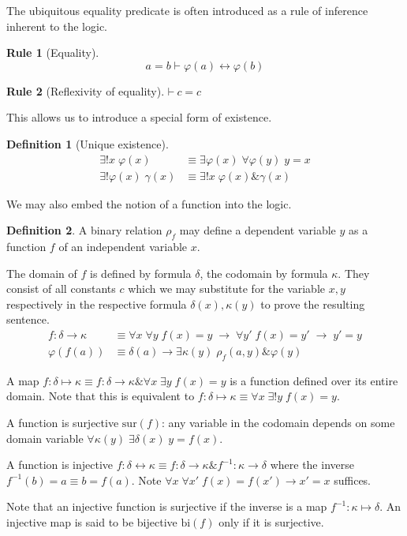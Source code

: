 \documentclass{amsbook}
\newcommand{\infers}{\mathrel\vdash}
\newcommand{\theorem}{\mathord\vdash\medspace}
\newcommand{\univ}[1]{\mathord\forall#1\;}
\newcommand{\exis}[1]{\mathord\exists#1\;}
\newcommand{\then}{\mathrel\rightarrow}
\newcommand{\conj}{\mathrel\&}
\newcommand{\eqv}{\mathrel\leftrightarrow}
\theoremstyle{definition}
\newtheorem{frule}{Rule}[chapter]
\newtheorem{dfn}{Definition}[section]
\begin{document}
The ubiquitous equality predicate is often introduced as a rule of inference inherent to the logic.

\begin{frule}[Equality]
    $$a = b \infers \varphi(a) \eqv \varphi(b)$$
\end{frule}

\begin{frule}[Reflexivity of equality]
    $\theorem c = c$
\end{frule}

This allows us to introduce a special form of existence.

\begin{dfn}[Unique existence]
    $$\begin{aligned}
            \exis{!x} \varphi(x)         & \equiv \exis{\varphi(x)} \univ{\varphi(y)} y = x \\
            \exis{!\varphi(x)} \gamma(x) & \equiv \exis{!x} \varphi(x) \conj \gamma(x)
        \end{aligned}$$
\end{dfn}

We may also embed the notion of a function into the logic.

\begin{dfn}
    A binary relation $\rho_f$ may define a dependent variable $y$ as a function $f$ of an independent variable $x$.

    The domain of $f$ is defined by formula $\delta$, the codomain by formula $\kappa$. They consist of all constants $c$ which we may substitute for the variable $x, y$ respectively in the respective formula $\delta(x),\kappa(y)$ to prove the resulting sentence.
    $$\begin{aligned}
            f: \delta \longrightarrow \kappa & \equiv \univ x \univ y f(x) = y\; \then \;\univ {y'} f(x) = y' \;\then\; y' = y \\
            \varphi(f(a))                    & \equiv \delta(a) \then \exis{\kappa(y)} \rho_f(a,y) \conj \varphi(y)
        \end{aligned}$$

    A map $f: \delta \longmapsto \kappa \equiv f: \delta \longrightarrow \kappa \conj \univ x \exis y f(x) = y$ is a function defined over its entire domain. Note that this is equivalent to $f: \delta \longmapsto \kappa \equiv \univ x \exis{!y} f(x) = y$.

    A function is surjective $\mathrm{sur}(f)$: any variable in the codomain depends on some domain variable $\univ{\kappa(y)}\exis{\delta(x)} y = f(x)$.

    A function is injective $f: \delta \longleftrightarrow \kappa \equiv f: \delta \longrightarrow \kappa \conj f^{-1}: \kappa \longrightarrow \delta$ where the inverse $f^{-1}(b) = a \equiv b = f(a)$. Note $\univ x \univ{x'} f(x) = f(x') \then x' = x$ suffices.

    Note that an injective function is surjective if the inverse is a map $f^{-1}: \kappa \longmapsto \delta$. An injective map is said to be bijective $\mathrm{bi}(f)$ only if it is surjective.
\end{dfn}
\end{document}
